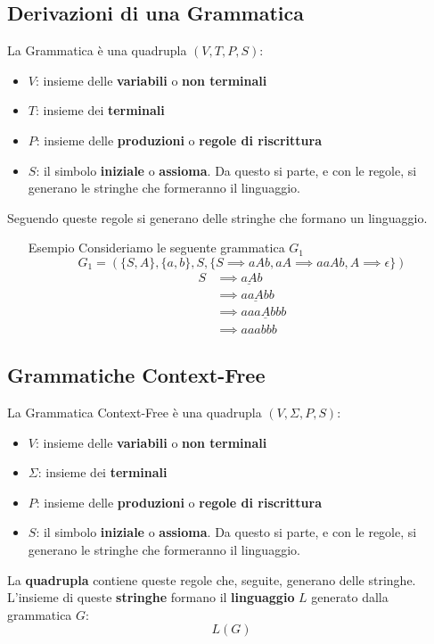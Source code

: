 \documentclass[12pt]{article}
\begin{document}
\subsection{Derivazioni di una Grammatica}
La Grammatica è una quadrupla $(V,T,P,S)$:
\begin{itemize}
    \item $V$: insieme delle \textbf{variabili} o \textbf{non terminali}
    \item $T$: insieme dei \textbf{terminali}
    \item $P$: insieme delle \textbf{produzioni} o \textbf{regole di riscrittura}
    \item $S$: il simbolo \textbf{iniziale} o \textbf{assioma}. Da questo si parte, e con le regole, si generano le stringhe che formeranno il linguaggio.
\end{itemize}
Seguendo queste regole si generano delle stringhe che formano un linguaggio.
\begin{itemize}
    \item[Esempio] Consideriamo le seguente grammatica $G_1$
    \begin{equation*}
        G_1=(\{S,A\},\{a,b\},S,\{S \implies aAb,aA \implies aaAb,A\implies \epsilon\})
    \end{equation*}
    \begin{align*}
        S &\implies \underline{aA}b\\
        &\implies a\underline{aA}bb\\
        &\implies aaa\underline{A}bbb\\
        &\implies aaabbb
    \end{align*}
\end{itemize}

\subsection{Grammatiche Context-Free}
La Grammatica Context-Free è una quadrupla $(V,\Sigma,P,S)$:
\begin{itemize}
    \item $V$: insieme delle \textbf{variabili} o \textbf{non terminali}
    \item $\Sigma$: insieme dei \textbf{terminali}
    \item $P$: insieme delle \textbf{produzioni} o \textbf{regole di riscrittura}
    \item $S$: il simbolo \textbf{iniziale} o \textbf{assioma}. Da questo si parte, e con le regole, si generano le stringhe che formeranno il linguaggio.
\end{itemize}
La \textbf{quadrupla} contiene queste regole che, seguite, generano delle stringhe.\\
L'insieme di queste \textbf{stringhe} formano il \textbf{linguaggio} $L$ generato dalla grammatica $G$:
\begin{equation*}
    L(G)
\end{equation*}
\end{document}
